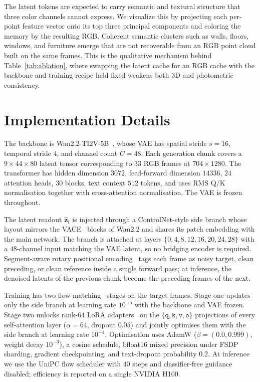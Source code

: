 The latent tokens are expected to carry semantic and textural structure that three color channels cannot express.
We visualize this by projecting each per-point feature vector onto its top three principal components and coloring the memory by the resulting RGB.
Coherent semantic clusters such as walls, floors, windows, and furniture emerge that are not recoverable from an RGB point cloud built on the same frames.
This is the qualitative mechanism behind Table~\ref{tab:ablation}, where swapping the latent cache for an RGB cache with the backbone and training recipe held fixed weakens both 3D and photometric consistency.


\section{Implementation Details}
\label{sec:app_implementation}

The backbone is Wan2.2-TI2V-5B~\cite{wan2025wan}, whose VAE has spatial stride $s = 16$, temporal stride $4$, and channel count $C = 48$.
Each generation chunk covers a $9 \times 44 \times 80$ latent tensor corresponding to $33$ RGB frames at $704 \times 1280$.
The transformer has hidden dimension $3072$, feed-forward dimension $14336$, $24$ attention heads, $30$ blocks, text context $512$ tokens, and uses RMS Q/K normalisation together with cross-attention normalisation.
The VAE is frozen throughout.

The latent readout $\hat{\mathbf{z}}_t$ is injected through a ControlNet-style side branch whose layout mirrors the VACE~\cite{jiang2025vace} blocks of Wan2.2 and shares its patch embedding with the main network.
The branch is attached at layers $\{0, 4, 8, 12, 16, 20, 24, 28\}$ with a $48$-channel input matching the VAE latent, so no bridging encoder is required.
Segment-aware rotary positional encoding~\cite{su2024roformer} tags each frame as noisy target, clean preceding, or clean reference inside a single forward pass; at inference, the denoised latents of the previous chunk become the preceding frames of the next.

Training has two flow-matching~\cite{lipman2022flow} stages on the target frames.
Stage one updates only the side branch at learning rate $10^{-5}$ with the backbone and VAE frozen.
Stage two unlocks rank-$64$ LoRA adapters~\cite{hu2021lora} on the $\{\texttt{q}, \texttt{k}, \texttt{v}, \texttt{o}\}$ projections of every self-attention layer ($\alpha = 64$, dropout $0.05$) and jointly optimises them with the side branch at learning rate $10^{-4}$.
Optimisation uses AdamW ($\beta = (0.0, 0.999)$, weight decay $10^{-3}$), a cosine schedule, bfloat16 mixed precision under FSDP sharding, gradient checkpointing, and text-dropout probability $0.2$.
At inference we use the UniPC flow scheduler with $40$ steps and classifier-free guidance disabled; efficiency is reported on a single NVIDIA H100.

